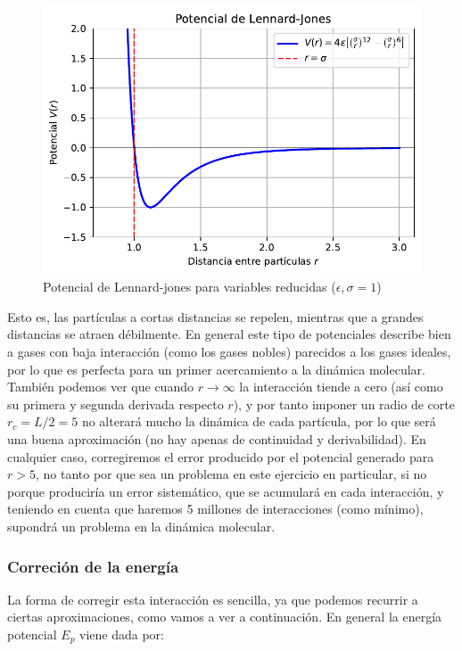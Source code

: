 \documentclass[11pt]{article}
\begin{document}
\begin{figure}[h!] \centering
\includegraphics[scale=0.95]{Lennard-jones.pdf}
\caption{Potencial de Lennard-jones para variables reducidas ($\epsilon,\sigma = 1$)}
\end{figure}    
Esto es, las partículas a cortas distancias se repelen, mientras que a grandes distancias se atraen débilmente. En general este tipo de potenciales describe bien a gases con baja interacción (como los gases nobles) parecidos a los gases ideales, por lo que es perfecta para un primer acercamiento a la dinámica molecular. También podemos ver que cuando $r \rightarrow \infty$ la interacción tiende a cero (así como su primera y segunda derivada respecto $r$), y por tanto imponer un radio de corte $r_c=L/2=5$ no alterará mucho la dinámica de cada partícula, por lo que será una buena aproximación (no hay apenas de continuidad y derivabilidad). En cualquier caso, corregiremos el error producido por el potencial generado para $r>5$, no tanto por que sea un problema en este ejercicio en particular, si no porque produciría un error sistemático, que se acumulará en cada interacción, y teniendo en cuenta que haremos 5 millones de interacciones (como mínimo), supondrá un problema en la dinámica molecular. \\

\subsubsection{Correción de la energía}


La forma de corregir esta interacción es sencilla, ya que podemos recurrir a ciertas aproximaciones, como vamos a ver a continuación. En general la energía potencial $E_p$ viene dada por:
\end{document}
